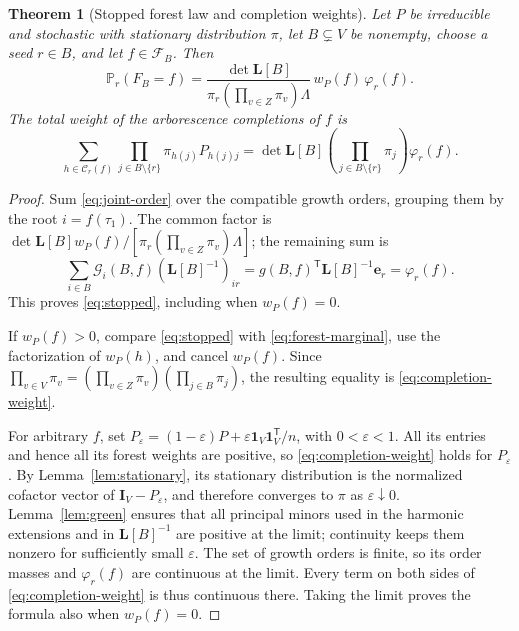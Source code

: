 \documentclass[11pt]{article}
\newtheorem{theorem}[definition]{Theorem}
\newcommand{\one}{\mathbf 1}
\newcommand{\Id}{\mathbf I}
\newcommand{\Lmat}{\mathbf L}
\begin{document}
\begin{theorem}[Stopped forest law and completion weights]
\label{thm:stopped}
Let $P$ be irreducible and stochastic with stationary
distribution $\pi$, let $B\subsetneq V$ be nonempty, choose a
seed $r\in B$, and let $f\in\mathcal F_B$. Then
\begin{equation}\label{eq:stopped}
\mathbb P_r(F_B=f)
=\frac{\det\Lmat[B]}
 {\pi_r(\prod_{v\in Z}\pi_v)\Lambda}
\,w_P(f)\,\varphi_r(f).
\end{equation}
The total weight of the arborescence completions of $f$ is
\begin{equation}\label{eq:completion-weight}
\sum_{h\in\mathcal C_r(f)}
 \prod_{j\in B\setminus\{r\}}
 \pi_{h(j)}P_{h(j)j}
=\det\Lmat[B]
 \left(\prod_{j\in B\setminus\{r\}}\pi_j\right)
 \varphi_r(f).
\end{equation}
\end{theorem}
\begin{proof}
Sum \eqref{eq:joint-order} over the compatible growth orders,
grouping them by the root $i=f(\tau_1)$. The common factor is
$\det\Lmat[B]w_P(f)/
[\pi_r(\prod_{v\in Z}\pi_v)\Lambda]$;
the remaining sum is
\[
\sum_{i\in B}\mathcal G_i(B,f)
   (\Lmat[B]^{-1})_{ir}
=g(B,f)^{\mathsf T}\Lmat[B]^{-1}\mathbf e_r
=\varphi_r(f).
\]
This proves \eqref{eq:stopped}, including when $w_P(f)=0$.

If $w_P(f)>0$, compare \eqref{eq:stopped} with
\eqref{eq:forest-marginal}, use the factorization of $w_P(h)$,
and cancel $w_P(f)$. Since
$\prod_{v\in V}\pi_v=
(\prod_{v\in Z}\pi_v)(\prod_{j\in B}\pi_j)$,
the resulting equality is \eqref{eq:completion-weight}.

For arbitrary $f$, set
$P_\varepsilon=(1-\varepsilon)P+
\varepsilon\one_V\one_V^{\mathsf T}/n$, with
$0<\varepsilon<1$. All its entries and hence all its forest
weights are positive, so \eqref{eq:completion-weight} holds for
$P_\varepsilon$. By Lemma~\ref{lem:stationary}, its stationary
distribution is the normalized cofactor vector of
$\Id_V-P_\varepsilon$, and therefore converges to $\pi$ as
$\varepsilon\downarrow0$. Lemma~\ref{lem:green} ensures that
all principal minors used in the harmonic extensions and in
$\Lmat[B]^{-1}$ are positive at the limit; continuity keeps them
nonzero for sufficiently small $\varepsilon$. The set of growth
orders is finite, so its order masses and $\varphi_r(f)$ are
continuous at the limit. Every term on both sides of
\eqref{eq:completion-weight} is thus continuous there.
Taking the limit proves the formula also when $w_P(f)=0$.
\end{proof}
\end{document}

